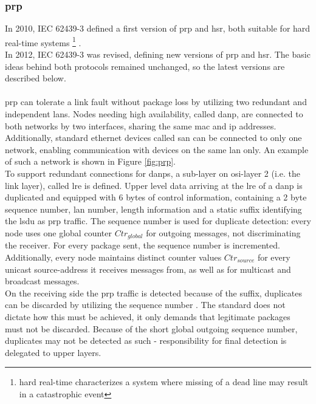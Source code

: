 \subsubsection{\gls{prp}}
In 2010, IEC 62439-3 defined a first version of {\gls{prp}} and \gls{hsr}, both suitable for hard real-time
systems \footnote{hard real-time characterizes a system where missing of a dead line may result in a catastrophic event} \cite{4416946}.
\\
In 2012, IEC 62439-3 was revised, defining new versions of \gls{prp} and \gls{hsr}. The basic ideas behind both protocols remained
unchanged, so the latest versions are described below.
\\
\\
\gls{prp} can tolerate a link fault without package loss by utilizing two redundant and independent \glspl{lan}.
Nodes needing high availability, called \gls{danp}, are connected to both networks by two interfaces, sharing the same \gls{mac} and \gls{ip} addresses.
Additionally, standard ethernet devices called \gls{san} can be connected to only one network, enabling communication with devices on the same \gls{lan} only.
An example of such a network is shown in Figure \ref{fig:prp}.
\\
To support redundant connections for \glspl{danp}, a sub-layer on \gls{osi}-layer 2 (i.e. the link layer), called \gls{lre} is defined. 
Upper level data arriving at the \gls{lre} of a \gls{danp} is duplicated and equipped with 6 bytes of control information, containing a 2 byte sequence number,
\gls{lan} number, length information and a static suffix identifying the \gls{lsdu} as \gls{prp} traffic. The sequence number is used for duplicate detection: 
every node uses one global counter $Ctr_{global}$ for outgoing messages, not discriminating the receiver. For every package sent, the sequence number is incremented.
Additionally, every node maintains distinct counter values $Ctr_{source}$ for every unicast source-address it receives messages from, as well as for multicast
and broadcast messages.
\\
On the receiving side the \gls{prp} traffic is detected because of the suffix, duplicates can be discarded by utilizing the sequence number \cite{6699852}.
The standard does not dictate how this must be achieved, it only demands that legitimate packages must not be discarded. Because of the short global outgoing 
sequence number, duplicates may not be detected as such - responsibility for final detection is delegated to upper layers.
